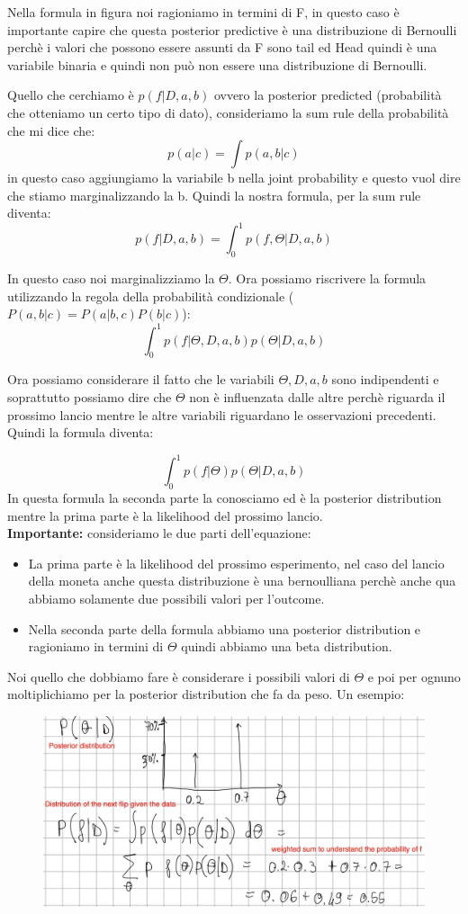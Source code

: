 \documentclass[14pt]{extreport}
\begin{document}
Nella formula in figura noi ragioniamo in termini di F, in questo caso è importante capire che questa posterior predictive è una distribuzione di
Bernoulli perchè i valori che possono essere assunti da F sono tail ed Head quindi è una variabile binaria e quindi non può non essere una
distribuzione di Bernoulli.

Quello che cerchiamo è $p(f|D, a,b)$ ovvero la posterior predicted (probabilità che otteniamo un certo tipo di dato), consideriamo la sum rule della
probabilità che mi dice che:
$$p(a|c) = \int p(a,b|c)$$ in questo caso aggiungiamo la variabile b nella joint probability e questo vuol dire che stiamo marginalizzando la b.
Quindi la nostra formula, per la sum rule diventa:
$$p(f|D, a,b) = \int_0^1p(f,\Theta|D,a,b)$$

In questo caso noi marginalizziamo la $\Theta$. Ora possiamo riscrivere la formula utilizzando la regola della probabilità condizionale ($P(a,b|c) =
P(a|b,c)P(b|c)$):
$$\int_0^1p(f|\Theta,D,a,b)p(\Theta|D,a,b)$$

Ora possiamo considerare il fatto che le variabili $\Theta,D,a,b$ sono indipendenti e soprattutto possiamo dire che $\Theta$ non è influenzata dalle
altre perchè riguarda il prossimo lancio mentre le altre variabili riguardano le osservazioni precedenti. Quindi la formula diventa:

$$\int_0^1p(f|\Theta)p(\Theta|D,a,b)$$ In questa formula la seconda parte la conosciamo ed è la posterior distribution mentre la prima parte è la
likelihood del prossimo lancio. \\
\textbf{Importante:} consideriamo le due parti dell'equazione:
\begin{itemize}
	\item La prima parte è la likelihood del prossimo esperimento, nel caso del lancio della moneta anche questa distribuzione è una bernoulliana
	      perchè anche qua abbiamo solamente due possibili valori per l'outcome.
	\item Nella seconda parte della formula abbiamo una posterior distribution e ragioniamo in termini di $\Theta$ quindi abbiamo una beta
	distribution.
\end{itemize}


Noi quello che dobbiamo fare è considerare i possibili valori di $\Theta$ e poi per ognuno moltiplichiamo per la posterior distribution che fa da
peso. Un esempio:
\begin{figure}[H]
	\centering
	\includegraphics[width=0.7\linewidth]{49.jpeg}
\end{figure}
\end{document}
